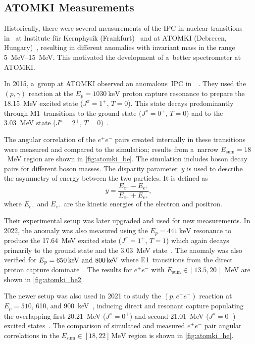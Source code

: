 		\subsection{ATOMKI Measurements}
			Historically, there were several measurements of the \ac{IPC} in nuclear transitions in~ at Institute für Kernphysik (Frankfurt)~\cite{ikf1996,ikf1997,ikf2001} and at ATOMKI (Debrecen, Hungary)~\cite{atomki2008,atomki2012}, resulting in different anomalies with invariant mass in the range \qtyrange{5}{15}{\MeV}. This motivated the development of a~better spectrometer at ATOMKI.
		
			In 2015, a~group at ATOMKI observed an anomalous~\ac{IPC} in~~\cite{atomki_be}. They used the $(p,\gamma)$ reaction at the $E_p = \qty{1030}{\keV}$ proton capture resonance to prepare the \qty{18.15}{\MeV} excited state ($J^\pi = 1^{+}$, $T=0$). This state decays predominantly through M1~transitions to the ground state ($J^\pi = 0^{+}$, $T=0$) and to the \qty{3.03}{\MeV} state ($J^\pi = 2^{+}$, $T=0$)~\cite{resonances}.
			
			The angular correlation of the $e^+ e^-$ pairs created internally in these transitions were measured and compared to the simulation; results from a~narrow $E_\text{sum}=18$~MeV region are shown in \cref{fig:atomki_be}. The simulation includes boson decay pairs for different boson masses. The disparity parameter~$y$ is used to describe the asymmetry of energy between the two particles. It is defined as
				\begin{equation}
					\label{eq:dispar}
					y = \frac{E_{e^-}-E_{e^+}}{E_{e^-}+E_{e^+}},
				\end{equation}
			where $E_{e^-}$ and $E_{e^+}$ are the kinetic energies of the electron and positron.
			
			Their experimental setup was later upgraded and used for new measurements. In 2022, the  anomaly was also measured using the $E_p = \qty{441}{\keV}$ resonance to produce the \qty{17.64}{\MeV} excited state ($J^\pi = 1^{+}$, $T=1$) which again decays primarily to the ground state and the \qty{3.03}{\MeV} state~\cite{resonances}. The anomaly was also verified for $E_p = \qtylist{650;800}{\keV}$ where E1~transitions from the direct proton capture dominate~\cite{atomki_be2}. The results for $e^+e^-$ with ${E_\text{sum}\in[13.5,20]}$~MeV are shown in \cref{fig:atomki_be2}.
			
			The newer setup was also used in 2021 to study the $(p,e^+ e^-)$ reaction at $E_p = 510$, 610, and 900~keV~\cite{atomki_he2}, inducing direct and resonant capture populating the overlapping first 20.21~MeV ($J^\pi = 0^+$) and second 21.01~MeV ($J^\pi = 0^-$) excited states~\cite{resonances2}. The comparison of simulated and measured $e^+e^-$ pair angular correlations in the ${E_\text{sum}\in[18,22]\,\unit{\MeV}}$ region is shown in \cref{fig:atomki_he}.
			
